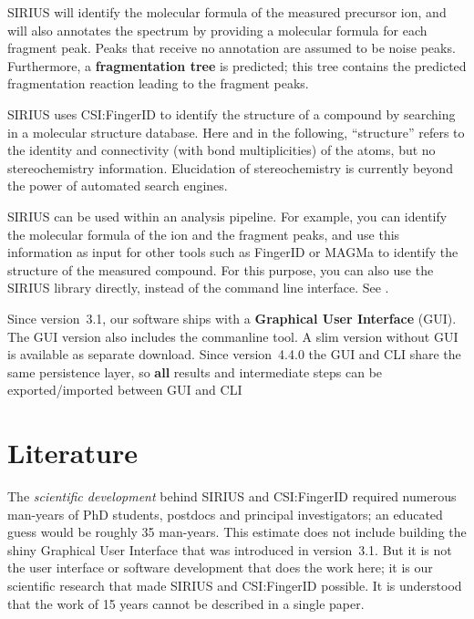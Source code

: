 \documentclass[letterpaper,10pt,openany,oneside]{sphinxmanual}
\begin{document}
SIRIUS will identify the molecular formula of the measured precursor ion,
and will also annotates the spectrum by providing a molecular formula for
each fragment peak.  Peaks that receive no annotation are assumed to be noise
peaks.  Furthermore, a \textbf{fragmentation tree} is predicted; this tree
contains the predicted fragmentation reaction leading to the fragment peaks.

SIRIUS uses CSI:FingerID to identify the structure of a compound by searching
in a molecular structure database.  Here and in the following, ``structure''
refers to the identity and connectivity (with bond multiplicities) of the
atoms, but no stereochemistry information.  Elucidation of stereochemistry is
currently beyond the power of automated search engines.

SIRIUS can be used within an analysis pipeline. For example, you can
identify the molecular formula of the ion and the fragment peaks, and use
this information as input for other tools such as FingerID or MAGMa to
identify the structure of the measured compound. For this purpose, you can
also use the SIRIUS library directly, instead of the command line
interface. See {\hyperref[library::doc]{}}.

Since version~3.1, our software ships with a \textbf{Graphical User
Interface} (GUI). The GUI version also includes the commanline tool. A slim version without GUI is available as separate download.
Since version~4.4.0 the GUI and CLI share the same persistence layer, so \textbf{all} results and intermediate steps can be exported/imported between GUI and CLI 

\clearpage


\section{Literature}
\label{introduction:literature}

The \emph{scientific development} behind SIRIUS and CSI:FingerID required
numerous man-years of PhD students, postdocs and principal investigators; an
educated guess would be roughly 35 man-years.  This estimate does not include
building the shiny Graphical User Interface that was introduced in
version~3.1.  But it is not the user interface or software development that
does the work here; it is our scientific research that made SIRIUS and
CSI:FingerID possible.  It is understood that the work of 15 years cannot be
described in a single paper.
\end{document}
